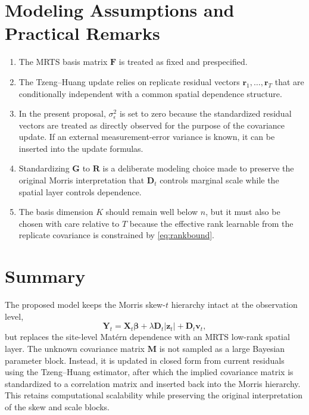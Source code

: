 \documentclass[11pt]{article}
\newcommand{\bY}{\mathbf{Y}}
\newcommand{\bX}{\mathbf{X}}
\newcommand{\bD}{\mathbf{D}}
\newcommand{\bF}{\mathbf{F}}
\newcommand{\bG}{\mathbf{G}}
\newcommand{\bM}{\mathbf{M}}
\newcommand{\bR}{\mathbf{R}}
\newcommand{\bz}{\mathbf{z}}
\newcommand{\br}{\mathbf{r}}
\begin{document}
\section{Modeling Assumptions and Practical Remarks}

\begin{enumerate}[leftmargin=2em]
\item The MRTS basis matrix $\bF$ is treated as fixed and prespecified.
\item The Tzeng--Huang update relies on replicate residual vectors
$\br_1, \ldots, \br_T$ that are conditionally independent with a common spatial
dependence structure.
\item In the present proposal, $\sigma_\epsilon^2$ is set to zero because the
standardized residual vectors are treated as directly observed for the purpose of
the covariance update. If an external measurement-error variance is known, it can
be inserted into the update formulas.
\item Standardizing $\bG$ to $\bR$ is a deliberate modeling choice made to
preserve the original Morris interpretation that $\bD_t$ controls marginal scale
while the spatial layer controls dependence.
\item The basis dimension $K$ should remain well below $n$, but it must also be
chosen with care relative to $T$ because the effective rank learnable from the
replicate covariance is constrained by \eqref{eq:rankbound}.
\end{enumerate}

\section{Summary}

The proposed model keeps the Morris skew-$t$ hierarchy intact at the observation
level,
\[
\bY_t = \bX_t \bm{\beta} + \lambda \bD_t |\bz_t| + \bD_t \mathbf{v}_t,
\]
but replaces the site-level Mat\'ern dependence with an MRTS low-rank spatial
layer. The unknown covariance matrix $\bM$ is not sampled as a large Bayesian
parameter block. Instead, it is updated in closed form from current residuals
using the Tzeng--Huang estimator, after which the implied covariance matrix is
standardized to a correlation matrix and inserted back into the Morris
hierarchy. This retains computational scalability while preserving the original
interpretation of the skew and scale blocks.
\end{document}
